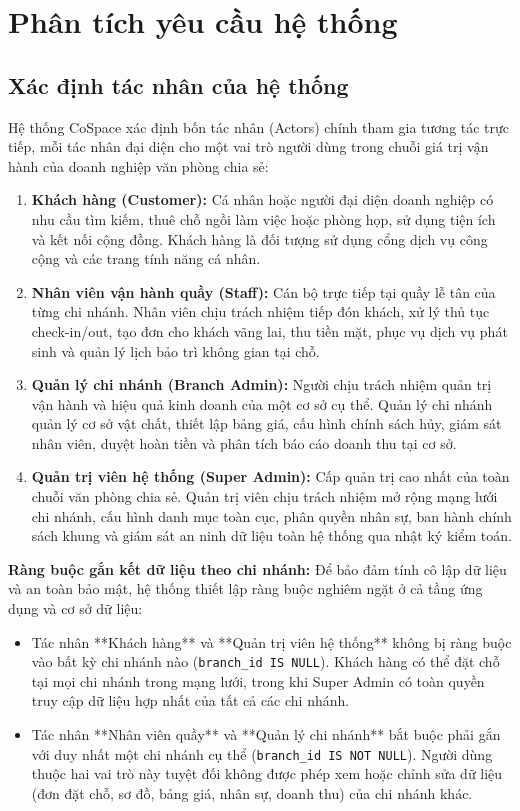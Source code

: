 \chapter{Phân tích yêu cầu hệ thống}
\label{ch:yeucau}

\section{Xác định tác nhân của hệ thống}
\label{sec:tacnhan}

Hệ thống CoSpace xác định bốn tác nhân (Actors) chính tham gia tương tác trực tiếp, mỗi tác nhân đại diện cho một vai trò người dùng trong chuỗi giá trị vận hành của doanh nghiệp văn phòng chia sẻ:
\begin{enumerate}
    \item \textbf{Khách hàng (Customer):} Cá nhân hoặc người đại diện doanh nghiệp có nhu cầu tìm kiếm, thuê chỗ ngồi làm việc hoặc phòng họp, sử dụng tiện ích và kết nối cộng đồng. Khách hàng là đối tượng sử dụng cổng dịch vụ công cộng và các trang tính năng cá nhân.
    \item \textbf{Nhân viên vận hành quầy (Staff):} Cán bộ trực tiếp tại quầy lễ tân của từng chi nhánh. Nhân viên chịu trách nhiệm tiếp đón khách, xử lý thủ tục check-in/out, tạo đơn cho khách vãng lai, thu tiền mặt, phục vụ dịch vụ phát sinh và quản lý lịch bảo trì không gian tại chỗ.
    \item \textbf{Quản lý chi nhánh (Branch Admin):} Người chịu trách nhiệm quản trị vận hành và hiệu quả kinh doanh của một cơ sở cụ thể. Quản lý chi nhánh quản lý cơ sở vật chất, thiết lập bảng giá, cấu hình chính sách hủy, giám sát nhân viên, duyệt hoàn tiền và phân tích báo cáo doanh thu tại cơ sở.
    \item \textbf{Quản trị viên hệ thống (Super Admin):} Cấp quản trị cao nhất của toàn chuỗi văn phòng chia sẻ. Quản trị viên chịu trách nhiệm mở rộng mạng lưới chi nhánh, cấu hình danh mục toàn cục, phân quyền nhân sự, ban hành chính sách khung và giám sát an ninh dữ liệu toàn hệ thống qua nhật ký kiểm toán.
\end{enumerate}

\noindent\textbf{Ràng buộc gắn kết dữ liệu theo chi nhánh:} Để bảo đảm tính cô lập dữ liệu và an toàn bảo mật, hệ thống thiết lập ràng buộc nghiêm ngặt ở cả tầng ứng dụng và cơ sở dữ liệu:
\begin{itemize}
    \item Tác nhân **Khách hàng** và **Quản trị viên hệ thống** không bị ràng buộc vào bất kỳ chi nhánh nào (\texttt{branch\_id IS NULL}). Khách hàng có thể đặt chỗ tại mọi chi nhánh trong mạng lưới, trong khi Super Admin có toàn quyền truy cập dữ liệu hợp nhất của tất cả các chi nhánh.
    \item Tác nhân **Nhân viên quầy** và **Quản lý chi nhánh** bắt buộc phải gắn với duy nhất một chi nhánh cụ thể (\texttt{branch\_id IS NOT NULL}). Người dùng thuộc hai vai trò này tuyệt đối không được phép xem hoặc chỉnh sửa dữ liệu (đơn đặt chỗ, sơ đồ, bảng giá, nhân sự, doanh thu) của chi nhánh khác.
\end{itemize}

